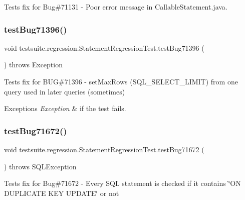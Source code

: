 Tests fix for Bug\#71131 -\/ Poor error message in Callable\+Statement.\+java. \mbox{\label{classtestsuite_1_1regression_1_1_statement_regression_test_a716338573789cf539312a6527ddd2ea6}} 
\subsubsection{\texorpdfstring{test\+Bug71396()}{testBug71396()}}
{\footnotesize\ttfamily void testsuite.\+regression.\+Statement\+Regression\+Test.\+test\+Bug71396 (\begin{DoxyParamCaption}{ }\end{DoxyParamCaption}) throws Exception}

Tests fix for B\+UG\#71396 -\/ set\+Max\+Rows (S\+Q\+L\+\_\+\+S\+E\+L\+E\+C\+T\+\_\+\+L\+I\+M\+IT) from one query used in later queries (sometimes)


\begin{DoxyExceptions}{Exceptions}
{\em Exception} & if the test fails. \\
\hline
\end{DoxyExceptions}
\mbox{\label{classtestsuite_1_1regression_1_1_statement_regression_test_ab1d12cefc8598fc6b119554ddfe01866}} 
\subsubsection{\texorpdfstring{test\+Bug71672()}{testBug71672()}}
{\footnotesize\ttfamily void testsuite.\+regression.\+Statement\+Regression\+Test.\+test\+Bug71672 (\begin{DoxyParamCaption}{ }\end{DoxyParamCaption}) throws S\+Q\+L\+Exception}

Tests fix for Bug\#71672 -\/ Every S\+QL statement is checked if it contains \char`\"{}\+O\+N D\+U\+P\+L\+I\+C\+A\+T\+E K\+E\+Y U\+P\+D\+A\+T\+E\char`\"{} or not



